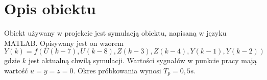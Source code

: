 \chapter{Opis obiektu}
\label{sec:opis}
Obiekt używany w projekcie jest symulacją obiektu, napisaną w języku MATLAB.
Opisywany jest on wzorem
\begin{equation}
  Y(k) = f(U(k - 7), U(k - 8), Z(k - 3), Z(k - 4), Y(k - 1), Y(k - 2))
\end{equation}
gdzie $k$ jest aktualną chwilą symulacji.
Wartości sygnałów w punkcie pracy mają wartość $u=y=z=0$. Okres próbkowania wynosi $T_p=0,5s$.